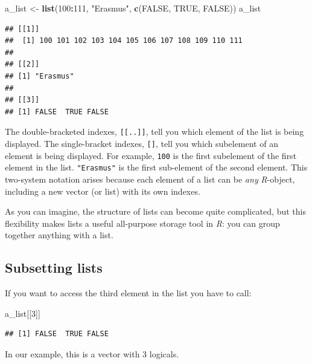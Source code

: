 \documentclass[
]{scrartcl}
\newenvironment{Shaded}{\begin{snugshade}}{\end{snugshade}}
\newcommand{\ConstantTok}[1]{\textcolor[rgb]{0.56,0.35,0.01}{#1}}
\newcommand{\DecValTok}[1]{\textcolor[rgb]{0.00,0.00,0.81}{#1}}
\newcommand{\FunctionTok}[1]{\textcolor[rgb]{0.13,0.29,0.53}{\textbf{#1}}}
\newcommand{\NormalTok}[1]{#1}
\newcommand{\OtherTok}[1]{\textcolor[rgb]{0.56,0.35,0.01}{#1}}
\newcommand{\SpecialCharTok}[1]{\textcolor[rgb]{0.81,0.36,0.00}{\textbf{#1}}}
\newcommand{\StringTok}[1]{\textcolor[rgb]{0.31,0.60,0.02}{#1}}
\begin{document}
\begin{Shaded}
\begin{Highlighting}[]
\NormalTok{a\_list }\OtherTok{\textless{}{-}} \FunctionTok{list}\NormalTok{(}\DecValTok{100}\SpecialCharTok{:}\DecValTok{111}\NormalTok{, }\StringTok{"Erasmus"}\NormalTok{, }\FunctionTok{c}\NormalTok{(}\ConstantTok{FALSE}\NormalTok{, }\ConstantTok{TRUE}\NormalTok{, }\ConstantTok{FALSE}\NormalTok{))}
\NormalTok{a\_list}
\end{Highlighting}
\end{Shaded}

\begin{verbatim}
## [[1]]
##  [1] 100 101 102 103 104 105 106 107 108 109 110 111
## 
## [[2]]
## [1] "Erasmus"
## 
## [[3]]
## [1] FALSE  TRUE FALSE
\end{verbatim}

The double-bracketed indexes, \texttt{{[}{[}..{]}{]}}, tell you which element of the list is being displayed. The single-bracket indexes, \texttt{{[}{]}}, tell you which subelement of an element is being displayed. For example, \texttt{100} is the first subelement of the first element in the list. \texttt{"Erasmus"} is the first sub-element of the second element. This two-system notation arises because each element of a list can be \emph{any} \emph{R}-object, including a new vector (or list) with its own indexes.

As you can imagine, the structure of lists can become quite complicated, but this flexibility makes lists a useful all-purpose storage tool in \emph{R}: you can group together anything with a list.

\subsection{Subsetting lists}\label{subsetting-lists}

If you want to access the third element in the list you have to call:

\begin{Shaded}
\begin{Highlighting}[]
\NormalTok{a\_list[[}\DecValTok{3}\NormalTok{]]}
\end{Highlighting}
\end{Shaded}

\begin{verbatim}
## [1] FALSE  TRUE FALSE
\end{verbatim}

In our example, this is a vector with 3 logicals.
\end{document}
